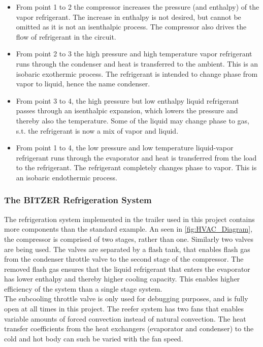 \begin{itemize}
	\item From point 1 to 2 the compressor increases the pressure (and enthalpy) of the vapor refrigerant. The increase in enthalpy is not desired, but cannot be omitted as it is not an isenthalpic process. The compressor also drives the flow of refrigerant in the circuit.
	\item From point 2 to 3 the high pressure and high temperature vapor refrigerant runs through the condenser and heat is transferred to the ambient. This is an isobaric exothermic process. The refrigerant is intended to change phase from vapor to liquid, hence the name condenser.
	\item From point 3 to 4, the high pressure but low enthalpy liquid refrigerant passes through an isenthalpic expansion, which lowers the pressure and thereby also the temperature. Some of the liquid may change phase to gas, s.t. the refrigerant is now a mix of vapor and liquid.
	\item From point 1 to 4, the low pressure and low temperature liquid-vapor refrigerant runs through the evaporator and heat is transferred from the load to the refrigerant. The refrigerant completely changes phase to vapor. This is an isobaric endothermic process. 
\end{itemize}
 
\subsubsection{The BITZER Refrigeration System}
The refrigeration system implemented in the trailer used in this project contains more components than the standard example. An seen in \cref{fig:HVAC_Diagram}, the compressor is comprised of two stages, rather than one. Similarly two valves are being used. The valves are separated by a flash tank, that enables flash gas from the condenser throttle valve to the second stage of the compressor. The removed flash gas ensures that the liquid refrigerant that enters the evaporator has lower enthalpy and thereby higher cooling capacity. This enables higher efficiency of the system than a single stage system.\\
The subcooling throttle valve is only used for debugging purposes, and is fully open at all times in this project. The reefer system has two fans that enables variable amounts of forced convection instead of natural convection. The heat transfer coefficients from the heat exchangers (evaporator and condenser) to the cold and hot body can such be varied with the fan speed.

